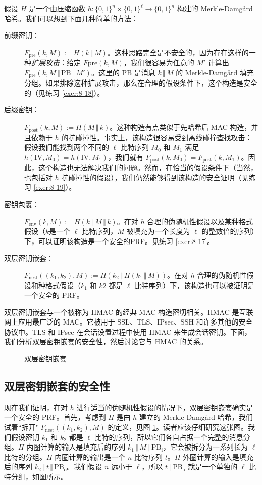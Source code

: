 假设 $H$ 是一个由压缩函数 $h:\{0,1\}^n\times\{0,1\}^\ell\to\{0,1\}^n$ 构建的 Merkle-Damg{\aa}rd 哈希。我们可以想到下面几种简单的方法：
\begin{description}
	\item [前缀密钥：] $F_\mathrm{pre}(k,M):=H(k\,\Vert\,M)$。这种思路完全是不安全的，因为存在这样的一种\emph{扩展攻击}：给定 $F\mathrm{pre}(k,M)$，我们很容易为任意的 $M'$ 计算出 $F_\mathrm{pre}(k,M\,\Vert\,\mathrm{PB}\,\Vert\,M')$。这里的 $\mathrm{PB}$ 是消息 $k\,\Vert\,M$ 的 Merkle-Damg{\aa}rd 填充分组。如果排除这种扩展攻击，那么在合理的假设条件下，这个构造是安全的（见练习 \ref{exer:8-18}）。
	\item [后缀密钥：] $F_\mathrm{post}(k,M):=H(M\,\Vert\,k)$。这种构造有点类似于先哈希后 MAC 构造，并且依赖于 $h$ 的抗碰撞性。事实上，该构造很容易受到离线碰撞查找攻击：假设我们能找到两个不同的 $\ell$ 比特序列 $M_0$ 和 $M_1$ 满足 $h(\mathrm{IV},M_0)=h(\mathrm{IV},M_1)$，我们就有 $F_\mathrm{post}(k,M_0)=F_\mathrm{post}(k,M_1)$。因此，这个构造也无法解决我们的问题。然而，在恰当的假设条件下（当然，也包括对 $h$ 抗碰撞性的假设），我们仍然能够得到该构造的安全证明（见练习 \ref{exer:8-19}）。
	\item [密钥包裹：] $F_\mathrm{env}(k,M):=H(k\,\Vert\,M\,\Vert\,k)$。在对 $h$ 合理的伪随机性假设以及某种格式假设（$k$是一个 $\ell$ 比特序列，$M$ 被填充为一个长度为 $\ell$ 的整数倍的序列）下，可以证明该构造是一个安全的PRF。见练习 \ref{exer:8-17}。
	\item [双层密钥嵌套：] $F_\mathrm{nest}((k_1,k_2),M):=H(k_2\,\Vert\,H(k_1\,\Vert\,M))$。在对 $h$ 合理的伪随机性假设和种格式假设（$k_1$ 和 $k2$ 都是 $\ell$ 比特序列）下，该构造也可以被证明是一个安全的 PRF。
\end{description}

双层密钥嵌套与一个被称为 HMAC 的经典 MAC 构造密切相关。HMAC 是互联网上应用最广泛的 MAC。它被用于 SSL、TLS、IPsec、SSH 和许多其他的安全协议中。TLS 和 IPsec 在会话设置过程中使用 HMAC 来生成会话密钥。下面，我们分析双层密钥嵌套的安全性，然后讨论它与 HMAC 的关系。

\begin{figure}
	\centering
	
	\caption{双层密钥嵌套}
	\label{fig:8-9}
\end{figure}

\subsection{双层密钥嵌套的安全性}\label{subsec:8-7-1}

现在我们证明，在对 $h$ 进行适当的伪随机性假设的情况下，双层密钥嵌套确实是一个安全的 PRF。首先，考虑到 $H$ 是由 $h$ 建立的 Merkle-Damg{\aa}rd 哈希，我们试着``拆开" $F_\mathrm{nest}((k_1,k_2),M)$ 的定义，见图 \ref{fig:8-9}。读者应该仔细研究这张图。我们假设密钥 $k_1$ 和 $k_2$ 都是 $\ell$ 比特的序列，所以它们各自占据一个完整的消息分组。$H$ 内圈计算的输入是填充后的序列 $k_1\,\Vert\,M\,\Vert\,\mathrm{PB}_\mathrm{i}$，它会被拆分为一系列长为 $\ell$ 比特的分组。$H$ 内圈计算的输出是一个 $n$ 比特序列 $t$。$H$ 外圈计算的输入是填充后的序列 $k_2\,\Vert\,t\,\Vert\,\mathrm{PB}_\mathrm{o}$。我们假设 $n$ 远小于 $\ell$，所以 $t\,\Vert\,\mathrm{PB}_\mathrm{o}$ 就是一个单独的 $\ell$ 比特分组，如图所示。

